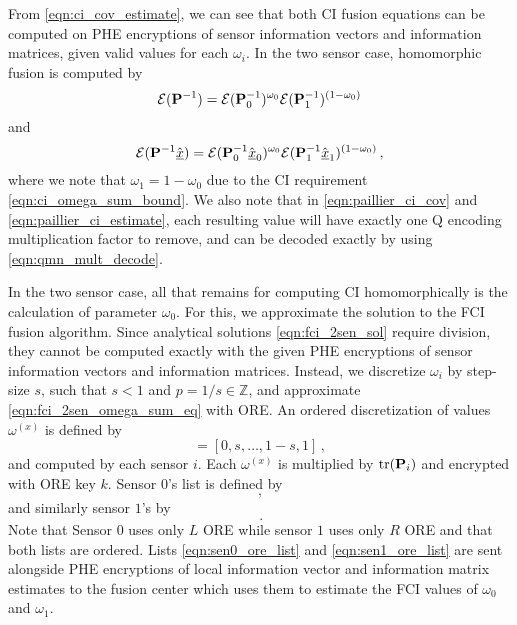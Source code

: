 \documentclass[letterpaper, 10 pt, conference]{ieeeconf}  %
\begin{document}
From \eqref{eqn:ci_cov_estimate}, we can see that both CI fusion equations can be computed on PHE encryptions of sensor information vectors and information matrices, given valid values for each $\omega_i$. In the two sensor case, homomorphic fusion is computed by
\begin{equation}
   \mathcal{E}({{\mathbf{P}}}^{-1}) = \mathcal{E}({{\mathbf{P}}}^{-1}_0)^{\omega_0}\mathcal{E}({{\mathbf{P}}}^{-1}_1)^{(1 -\omega_0)} \label{eqn:paillier_ci_cov}
\end{equation}
and
\begin{equation}
   \mathcal{E}({{\mathbf{P}}}^{-1}\hat{{\underline{x}}}) = \mathcal{E}({{\mathbf{P}}}^{-1}_0\hat{{\underline{x}}}_0)^{\omega_0}\mathcal{E}({{\mathbf{P}}}^{-1}_1\hat{{\underline{x}}}_1)^{(1 - \omega_0)}\,, \label{eqn:paillier_ci_estimate}
\end{equation}
where we note that $\omega_1=1-\omega_0$ due to the CI requirement \eqref{eqn:ci_omega_sum_bound}. We also note that in \eqref{eqn:paillier_ci_cov} and \eqref{eqn:paillier_ci_estimate}, each resulting value will have exactly one Q encoding multiplication factor to remove, and can be decoded exactly by using \eqref{eqn:qmn_mult_decode}.
   
In the two sensor case, all that remains for computing CI homomorphically is the calculation of parameter $\omega_0$. For this, we approximate the solution to the FCI fusion algorithm. Since analytical solutions \eqref{eqn:fci_2sen_sol} require division, they cannot be computed exactly with the given PHE encryptions of sensor information vectors and information matrices. Instead, we discretize $\omega_i$ by step-size $s$, such that $s<1$ and $p=1/s \in \mathbb{Z}$, and approximate \eqref{eqn:fci_2sen_omega_sum_eq} with ORE. An ordered discretization of values $\omega^{(x)}$ is defined by
\begin{equation}
   [\omega^{(0)},\dots,\omega^{(p)}] = [0,s,\dots,1-s,1]\,,
\end{equation}
and computed by each sensor $i$. Each $\omega^{(x)}$ is multiplied by $\operatorname{tr}({{\mathbf{P}}}_i)$ and encrypted with ORE key $k$. Sensor $0$'s list is defined by 
\begin{equation}
   [\mathcal{E}^L_{ORE}(\omega^{(0)}\tr(\mP_0)),\dots,\mathcal{E}^L_{ORE}(\omega^{(p)}\tr(\mP_0))]\,, \label{eqn:sen0_ore_list}
\end{equation}
and similarly sensor $1$'s by
\begin{equation}
   [\mathcal{E}^R_{ORE}(\omega^{(0)}\tr(\mP_1)),\dots,\mathcal{E}^L_{ORE}(\omega^{(p)}\tr(\mP_1))]\,. \label{eqn:sen1_ore_list}
\end{equation}
Note that Sensor $0$ uses only $L$ ORE while sensor $1$ uses only $R$ ORE and that both lists are ordered. Lists \eqref{eqn:sen0_ore_list} and \eqref{eqn:sen1_ore_list} are sent alongside PHE encryptions of local information vector and information matrix estimates to the fusion center which uses them to estimate the FCI values of $\omega_0$ and $\omega_1$.
\end{document}

